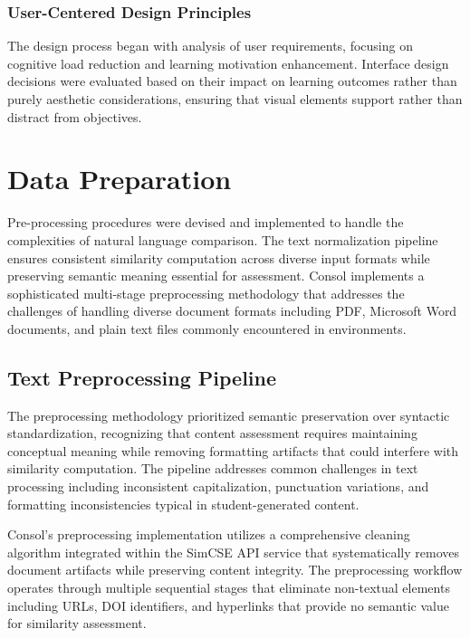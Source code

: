 {\subsubsection{User-Centered Design Principles}

The design process began with analysis of user requirements, focusing on cognitive load reduction and learning motivation enhancement. Interface design decisions were evaluated based on their impact on learning outcomes rather than purely aesthetic considerations, ensuring that visual elements support rather than distract from objectives.
}

{\color{maroon}
\section{Data Preparation}
\label{sec:data_preparation}

Pre-processing procedures were devised and implemented to handle the complexities of natural language comparison. The text normalization pipeline ensures consistent similarity computation across diverse input formats while preserving semantic meaning essential for assessment. Consol implements a sophisticated multi-stage preprocessing methodology that addresses the challenges of handling diverse document formats including PDF, Microsoft Word documents, and plain text files commonly encountered in environments.

\subsection{Text Preprocessing Pipeline}

The preprocessing methodology prioritized semantic preservation over syntactic standardization, recognizing that content assessment requires maintaining conceptual meaning while removing formatting artifacts that could interfere with similarity computation. The pipeline addresses common challenges in text processing including inconsistent capitalization, punctuation variations, and formatting inconsistencies typical in student-generated content.

Consol's preprocessing implementation utilizes a comprehensive cleaning algorithm integrated within the SimCSE API service that systematically removes document artifacts while preserving content integrity. The preprocessing workflow operates through multiple sequential stages that eliminate non-textual elements including URLs, DOI identifiers, and hyperlinks that provide no semantic value for similarity assessment.

}
